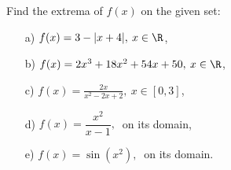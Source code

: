 \begin{problem}
Find the extrema of $f(x)$ on the given set:
    \begin{enumerate}
        \item[a) ] $f(x)=3-|x+4|,\: x\in\R$,
        \item[b) ] $f(x)=2x^3+18x^2+54x+50,\: x\in\R$,
        \item[c) ] $f(x) =
      \displaystyle{\frac{2x}{x^2-2x+2}},\: x\in[0,3]$,
        \item[d) ] $f(x)=\dfrac{x^2}{x-1},\: $ on its domain,
        \item[e) ] $f(x)=\sin(x^2),\: $ on its domain.
    \end{enumerate}
\end{problem}









